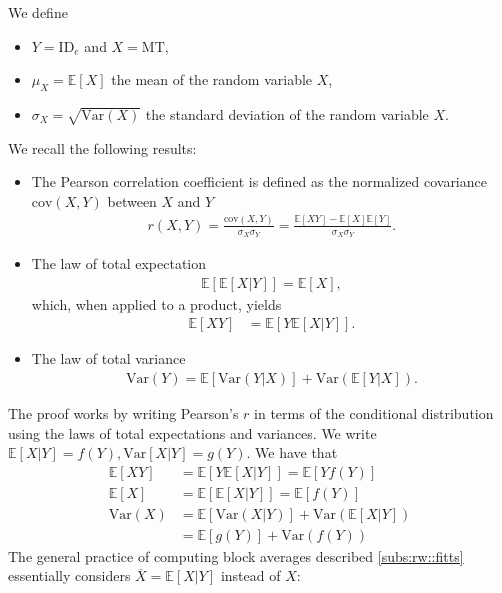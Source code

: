 \documentclass[acmlarge, manuscript,review]{acmart}
\newcommand{\mt}{\ensuremath{{\text{MT}}}\xspace}
\newcommand{\ide}{\ensuremath{{\text{ID}_e}}\xspace}
\begin{document}
We define
\begin{itemize}
	\item $Y=\ide$ and $X=\mt$,
	\item $\mu_X = \mathbb{E}[X]$ the mean of the random variable $X$,
	\item $\sigma_X = \sqrt{\text{Var}(X)}$ the standard deviation of the random variable $X$.
\end{itemize}
We recall the following results:
\begin{itemize}
	\item The Pearson correlation coefficient is defined as the normalized covariance $\text{cov}(X,Y)$ between $X$ and $Y$
	\begin{align}
		r(X,Y) = \frac{\text{cov}(X,Y)}{\sigma_X \sigma_Y} = \frac{\mathbb{E}[XY] - \mathbb{E}[X]\mathbb{E}[Y]}{\sigma_X \sigma_Y}. \label{eq:pearson_definition}
	\end{align}
	\item The law of total expectation
		\begin{align}
			\mathbb{E}[\mathbb{E}[X|Y]] = \mathbb{E}[X],
		\end{align}
		which, when applied to a product, yields
		\begin{align}
			\mathbb{E}[XY] & = \mathbb{E}[Y\mathbb{E}[X|Y]].
		\end{align}
	\item The law of total variance
		\begin{align}
			\text{Var}(Y) = \mathbb{E}[\text{Var}(Y|X)] + \text{Var}(\mathbb{E}[Y|X]).
		\end{align}
\end{itemize}
The proof works by writing Pearson's $r$ in terms of the conditional distribution using the laws of total expectations and variances.
We write $\mathbb{E}[X|Y] = f(Y), \text{Var}[X|Y] = g(Y)$. We have that
\begin{align}
	\mathbb{E}[XY] & = \mathbb{E}[Y\mathbb{E}[X|Y]]   =      \mathbb{E}[Yf(Y)]   \label{eq:proof_1}                   \\
	\mathbb{E}[X]  & = \mathbb{E}[\mathbb{E}[X|Y]] = \mathbb{E}[f(Y)]           \label{eq:proof_2}                    \\
	\text{Var}(X)  & = \mathbb{E}[\text{Var}(X|Y)] + \text{Var}(\mathbb{E}[X|Y])                   \label{eq:proof_3} \\
	               & = \mathbb{E}[g(Y)] + \text{Var}(f(Y))
\end{align}
The general practice of computing block averages described \autoref{subs:rw::fitts} essentially considers $\overline{X} = \mathbb{E}[X|Y]$ instead of $X$:
\end{document}
